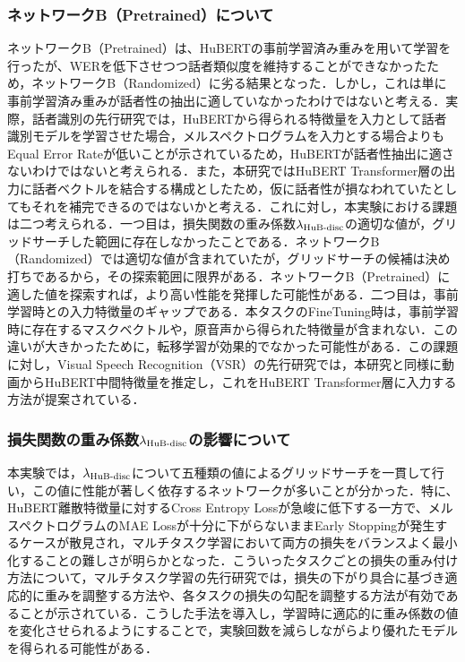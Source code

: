 \subsubsection{ネットワークB（Pretrained）について}
ネットワークB（Pretrained）は、HuBERTの事前学習済み重みを用いて学習を行ったが、WERを低下させつつ話者類似度を維持することができなかったため，ネットワークB（Randomized）に劣る結果となった．しかし，これは単に事前学習済み重みが話者性の抽出に適していなかったわけではないと考える．実際，話者識別の先行研究\cite{chen2022large}では，HuBERTから得られる特徴量を入力として話者識別モデルを学習させた場合，メルスペクトログラムを入力とする場合よりもEqual Error Rateが低いことが示されているため，HuBERTが話者性抽出に適さないわけではないと考えられる．また，本研究ではHuBERT Transformer層の出力に話者ベクトルを結合する構成としたため，仮に話者性が損なわれていたとしてもそれを補完できるのではないかと考える．これに対し，本実験における課題は二つ考えられる．一つ目は，損失関数の重み係数$\lambda_{\text{HuB-disc}}$の適切な値が，グリッドサーチした範囲に存在しなかったことである．ネットワークB（Randomized）では適切な値が含まれていたが，グリッドサーチの候補は決め打ちであるから，その探索範囲に限界がある．ネットワークB（Pretrained）に適した値を探索すれば，より高い性能を発揮した可能性がある．二つ目は，事前学習時との入力特徴量のギャップである．本タスクのFineTuning時は，事前学習時に存在するマスクベクトルや，原音声から得られた特徴量が含まれない．この違いが大きかったために，転移学習が効果的でなかった可能性がある．この課題に対し，Visual Speech Recognition（VSR）の先行研究\cite{djilali2023lip2vec}では，本研究と同様に動画からHuBERT中間特徴量を推定し，これをHuBERT Transformer層に入力する方法が提案されている．

\subsubsection{損失関数の重み係数$\lambda_{\text{HuB-disc}}$の影響について}
本実験では，$\lambda_{\text{HuB-disc}}$について五種類の値によるグリッドサーチを一貫して行い，この値に性能が著しく依存するネットワークが多いことが分かった．特に、HuBERT離散特徴量に対するCross Entropy Lossが急峻に低下する一方で、メルスペクトログラムのMAE Lossが十分に下がらないままEarly Stoppingが発生するケースが散見され，マルチタスク学習において両方の損失をバランスよく最小化することの難しさが明らかとなった．こういったタスクごとの損失の重み付け方法について，マルチタスク学習の先行研究では，損失の下がり具合に基づき適応的に重みを調整する方法\cite{chen2018gradnorm,liu2019end}や、各タスクの損失の勾配を調整する方法\cite{yu2020gradient}が有効であることが示されている．こうした手法を導入し，学習時に適応的に重み係数の値を変化させられるようにすることで，実験回数を減らしながらより優れたモデルを得られる可能性がある．